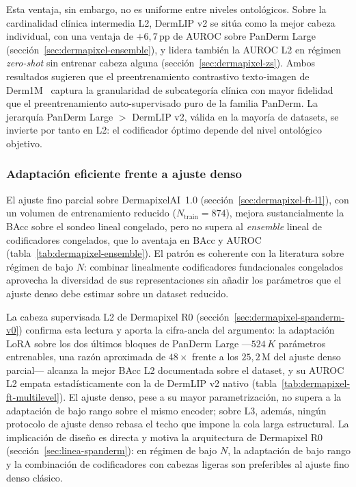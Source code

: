 Esta ventaja, sin embargo, no es uniforme entre niveles ontológicos.
Sobre la cardinalidad clínica intermedia L2, DermLIP v2 se sitúa como
la mejor cabeza individual, con una ventaja de $+6{,}7$\,pp de AUROC
sobre PanDerm Large (sección~\ref{sec:dermapixel-ensemble}), y lidera
también la AUROC L2 en régimen \emph{zero-shot} sin entrenar cabeza
alguna (sección~\ref{sec:dermapixel-zs}). Ambos resultados sugieren
que el preentrenamiento contrastivo texto-imagen de
Derm1M~\cite{derm1m} captura la granularidad de subcategoría clínica
con mayor fidelidad que el preentrenamiento auto-supervisado puro de
la familia PanDerm. La jerarquía PanDerm Large $>$ DermLIP v2, válida
en la mayoría de datasets, se invierte por tanto en L2: el codificador
óptimo depende del nivel ontológico objetivo.

\subsubsection{Adaptación eficiente frente a ajuste denso}
\label{sec:disc-lora-vs-ft}

El ajuste fino parcial sobre DermapixelAI~1.0
(sección~\ref{sec:dermapixel-ft-l1}), con un volumen de entrenamiento
reducido ($N_{\mathrm{train}} = 874$), mejora sustancialmente la BAcc
sobre el sondeo lineal congelado, pero no supera al \emph{ensemble}
lineal de codificadores congelados, que lo aventaja en BAcc y AUROC
(tabla~\ref{tab:dermapixel-ensemble}). El patrón es coherente con la
literatura sobre régimen de bajo $N$: combinar linealmente
codificadores fundacionales congelados aprovecha la diversidad de sus
representaciones sin añadir los parámetros que el ajuste denso debe
estimar sobre un dataset reducido.

La cabeza supervisada L2 de Dermapixel R0
(sección~\ref{sec:dermapixel-spanderm-v0}) confirma esta lectura y
aporta la cifra-ancla del argumento: la adaptación LoRA sobre los dos
últimos bloques de PanDerm Large ---$524\,K$ parámetros entrenables,
una razón aproximada de $48\times$ frente a los $25{,}2$\,M del ajuste
denso parcial--- alcanza la mejor BAcc L2 documentada sobre el
dataset, y su AUROC L2 empata estadísticamente con la de DermLIP v2
nativo (tabla~\ref{tab:dermapixel-ft-multilevel}). El ajuste denso,
pese a su mayor parametrización, no supera a la adaptación de bajo
rango sobre el mismo encoder; sobre L3, además, ningún protocolo de
ajuste denso rebasa el techo que impone la cola larga estructural. La
implicación de diseño es directa y motiva la arquitectura de
Dermapixel R0 (sección~\ref{sec:linea-spanderm}): en régimen de bajo
$N$, la adaptación de bajo rango y la combinación de codificadores con
cabezas ligeras son preferibles al ajuste fino denso clásico.


